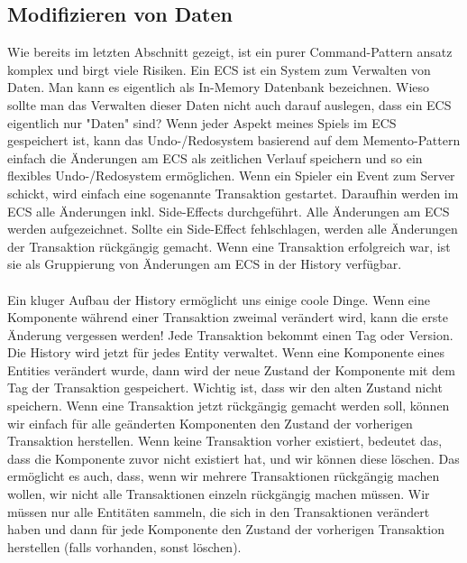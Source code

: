 \documentclass[11pt]{article}
\begin{document}
    \subsection{Modifizieren von Daten}
    Wie bereits im letzten Abschnitt gezeigt, ist ein purer Command-Pattern ansatz komplex und birgt viele Risiken.
    Ein ECS ist ein System zum Verwalten von Daten.
    Man kann es eigentlich als In-Memory Datenbank bezeichnen.
    Wieso sollte man das Verwalten dieser Daten nicht auch darauf auslegen, dass ein ECS eigentlich nur "Daten" sind?
    Wenn jeder Aspekt meines Spiels im ECS gespeichert ist, kann das Undo-/Redosystem basierend auf dem Memento-Pattern
    einfach die Änderungen am ECS als zeitlichen Verlauf speichern und so ein flexibles Undo-/Redosystem ermöglichen.
    Wenn ein Spieler ein Event zum Server schickt, wird einfach eine sogenannte Transaktion gestartet.
    Daraufhin werden im ECS alle Änderungen inkl. Side-Effects durchgeführt.
    Alle Änderungen am ECS werden aufgezeichnet.
    Sollte ein Side-Effect fehlschlagen, werden alle Änderungen der Transaktion rückgängig gemacht.
    Wenn eine Transaktion erfolgreich war,
    ist sie als Gruppierung von Änderungen am ECS in der History verfügbar.

    \paragraph{}
    Ein kluger Aufbau der History ermöglicht uns einige coole Dinge.
    Wenn eine Komponente während einer Transaktion zweimal
    verändert wird, kann die erste Änderung vergessen werden!
    Jede Transaktion bekommt einen Tag oder Version.
    Die History wird jetzt für jedes Entity verwaltet.
    Wenn eine Komponente eines Entities verändert wurde, dann wird der neue
    Zustand der Komponente mit dem Tag der Transaktion gespeichert.
    Wichtig ist, dass wir den alten Zustand nicht speichern.
    Wenn eine Transaktion jetzt rückgängig gemacht werden soll, können wir einfach für alle geänderten Komponenten den Zustand
    der vorherigen Transaktion herstellen.
    Wenn keine Transaktion vorher existiert, bedeutet das, dass die Komponente zuvor nicht
    existiert hat, und wir können diese löschen.
    Das ermöglicht es auch, dass, wenn wir mehrere Transaktionen rückgängig machen wollen, wir nicht alle Transaktionen einzeln
    rückgängig machen müssen.
    Wir müssen nur alle Entitäten sammeln, die sich in den Transaktionen verändert haben und dann für jede
    Komponente den Zustand der vorherigen Transaktion herstellen (falls vorhanden, sonst löschen).
\end{document}
